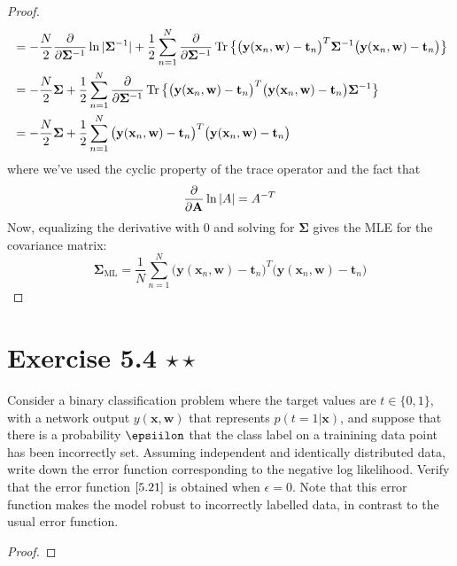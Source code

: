 \begin{proof}
\begin{align*}
        &= -\frac{N}{2} \pdv{\mathbf{\Sigma}^{-1}} \ln |\mathbf{\Sigma}^{-1}| +
        \frac{1}{2}  \sum_{n=1}^{N} \pdv{\mathbf{\Sigma}^{-1}} 
        \Trace\big\{\big(\mathbf{y}(\mathbf{x}_n, \mathbf{w}) - \mathbf{t}_n\big)^T
        \mathbf{\Sigma}^{-1}\big(\mathbf{y}(\mathbf{x}_n, \mathbf{w}) - \mathbf{t}_n\big)\big\} \\
        &= -\frac{N}{2} \mathbf{\Sigma} 
        + \frac{1}{2}  \sum_{n=1}^{N} \pdv{\mathbf{\Sigma}^{-1}} 
        \Trace\big\{\big(\mathbf{y}(\mathbf{x}_n, \mathbf{w}) - \mathbf{t}_n\big)^T
        \big(\mathbf{y}(\mathbf{x}_n, \mathbf{w}) - \mathbf{t}_n\big) \mathbf{\Sigma}^{-1}\big\}\\
        &= -\frac{N}{2} \mathbf{\Sigma} + \frac{1}{2} \sum_{n=1}^{N} 
        \big(\mathbf{y}(\mathbf{x}_n, \mathbf{w}) - \mathbf{t}_n\big)^T
        \big(\mathbf{y}(\mathbf{x}_n, \mathbf{w}) - \mathbf{t}_n\big)
    \end{align*}
    where we've used the cyclic property of the trace operator and the fact that
    \[
        \pdv{\mathbf{A}} \ln |A| = A^{-T}
    \]
    Now, equalizing
    the derivative with 0 and solving for $\mathbf{\Sigma}$ gives
    the MLE for the covariance matrix:
    \[
        \mathbf{\Sigma}_\text{ML}
        = \frac{1}{N} \sum_{n=1}^{N} 
        \big(\mathbf{y}(\mathbf{x}_n, \mathbf{w}) - \mathbf{t}_n\big)^T
        \big(\mathbf{y}(\mathbf{x}_n, \mathbf{w}) - \mathbf{t}_n\big)
    \] 
\end{proof}

\section*{Exercise 5.4 $\star \star$}
Consider a binary classification problem where the target values
are $t \in \{0, 1\}$, with a network output $y(\mathbf{x}, \mathbf{w})$
that represents $p(t = 1 | \mathbf{x})$, and suppose that
there is a probability $\epsiilon$ that the class label
on a trainining data point has been incorrectly set.
Assuming independent and identically distributed data,
write down the error function corresponding to the negative
log likelihood. Verify that the error function $\eqref{5.21}$ 
is obtained when $\epsilon = 0$. Note that this error function
makes the model robust to incorrectly labelled data, in contrast
to the usual error function.

\vspace{1em}

\begin{proof}
    
\end{proof}
